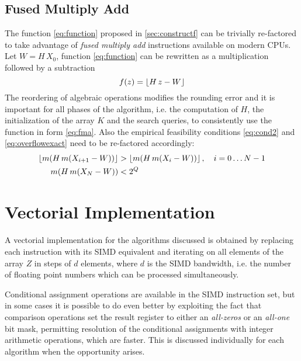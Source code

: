 \documentclass[preprint,1p,times]{elsarticle}
\begin{document}
\subsection{Fused Multiply Add}
The function \eqref{eq:function} proposed in \ref{sec:constructf} can be trivially re-factored to take advantage of \textit{fused multiply add} instructions available on modern CPUs. Let $W=H\, X_0$, function \eqref{eq:function} can be rewritten as a multiplication followed by a subtraction
\begin{equation}
\label{eq:fma}
   f(z) =\left \lfloor H \, z-W \right \rfloor
\end{equation}
The reordering of algebraic operations modifies the rounding error and it is important for all phases of the algorithm, i.e. the computation of $H$, the initialization of the array $K$ and the search queries, to consistently use the function in form \eqref{eq:fma}. Also the empirical feasibility conditions \eqref{eq:cond2} and \eqref{eq:overflowexact} need to be re-factored accordingly:
\begin{align*}
	\left \lfloor m(H\,m(X_{i+1}-W)) \right \rfloor &> \left \lfloor m(H\,m(X_{i}-W)) \right \rfloor,   \quad i=0\dots N-1 \\
	m(H\,m(X_{N}-W)) &< 2^Q
\end{align*}

\section{Vectorial Implementation}
\label{sec:vectorialimpl}

A vectorial implementation for the algorithms discussed is obtained by replacing each instruction with its SIMD equivalent and iterating on all elements of the array $Z$ in steps of $d$ elements, where $d$ is the SIMD bandwidth, i.e. the number of floating point numbers which can be processed simultaneously.

Conditional assignment operations are available in the SIMD instruction set, but in some cases it is possible to do even better by exploiting the fact that comparison operations set the result register to either an \textit{all-zeros} or an \textit{all-one} bit mask, permitting resolution of the conditional assignments with integer arithmetic operations, which are faster. This is discussed individually for each algorithm when the opportunity arises.
\end{document}
